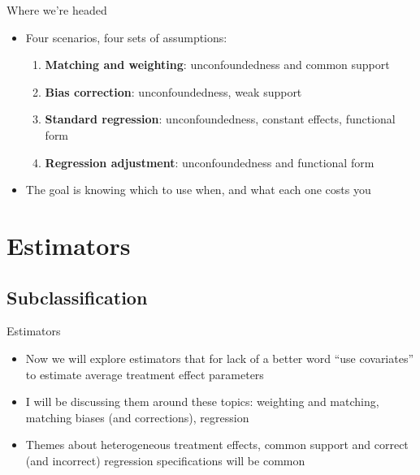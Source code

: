 \documentclass{beamer}
\begin{document}
\begin{frame}{Where we're headed}

\begin{itemize}
\item Four scenarios, four sets of assumptions:
	\begin{enumerate}
	\item \textbf{Matching and weighting}: unconfoundedness and common support
	\item \textbf{Bias correction}: unconfoundedness, weak support
	\item \textbf{Standard regression}: unconfoundedness, constant effects, functional form
	\item \textbf{Regression adjustment}: unconfoundedness and functional form
	\end{enumerate}
\item The goal is knowing which to use when, and what each one costs you
\end{itemize}

\end{frame}


\section{Estimators}


\subsection{Subclassification}

\begin{frame}{Estimators}

\begin{itemize}

\item Now we will explore estimators that for lack of a better word ``use covariates'' to estimate average treatment effect parameters
\item I will be discussing them around these topics: weighting and matching, matching biases (and corrections), regression
\item Themes about heterogeneous treatment effects, common support and correct (and incorrect) regression specifications will be common

\end{itemize}

\end{frame}
\end{document}
